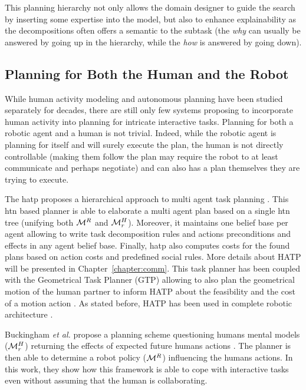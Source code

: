 \documentclass[a4paper,11pt,twoside]{StyleThese}
\begin{document}
This planning hierarchy not only allows the domain designer to guide the search by inserting some expertise into the model, but also to enhance explainability as the decompositions often offers a semantic to the subtask (the \textit{why} can usually be answered by going up in the hierarchy, while the \textit{how} is answered by going down).

\subsection{Planning for Both the Human and the Robot}
While human activity modeling and autonomous planning have been studied separately for decades, there are still only few systems proposing to incorporate human activity into planning for intricate interactive tasks.
Planning for both a robotic agent and a human is not trivial. Indeed, while the robotic agent is planning for itself and will surely execute the plan, the human is not directly controllable (making them follow the plan may require the robot to at least communicate and perhaps negotiate) and can also has a plan themselves they are trying to execute.

The \acrfull{hatp} proposes a hierarchical approach to multi agent task planning \cite{alili2009task, lallement2014hatp}. This \acrshort{htn} based planner is able to elaborate a multi agent plan based on a single \acrshort{htn} tree (unifying both $\mathcal{M}^R$ and $\mathcal{M}^H_r$). Moreover, it maintains one belief base per agent allowing to write task decomposition rules and actions preconditions and effects in any agent belief base. Finally, \acrshort{hatp} also computes costs for the found plans based on action costs and predefined social rules. More details about HATP will be presented in Chapter~\ref{chapter:comm}. This task planner has been coupled with the Geometrical Task Planner (GTP) allowing to also plan the geometrical motion of the human partner to inform HATP about the feasibility and the cost of a motion action \cite{gharbi2015combining}. As stated before, HATP has been used in complete robotic architecture \cite{devin2016implemented, lemaignan2017artificial}.

Buckingham \textit{et al.} propose a planning scheme questioning humans mental models ($\mathcal{M}^H_r$) returning the effects of expected future humans actions \cite{buckingham2020robot}. The planner is then able to determine a robot policy ($\mathcal{M}^R$) influencing the humans actions. In this work, they show how this framework is able to cope with interactive tasks even without assuming that the human is collaborating.
\end{document}
